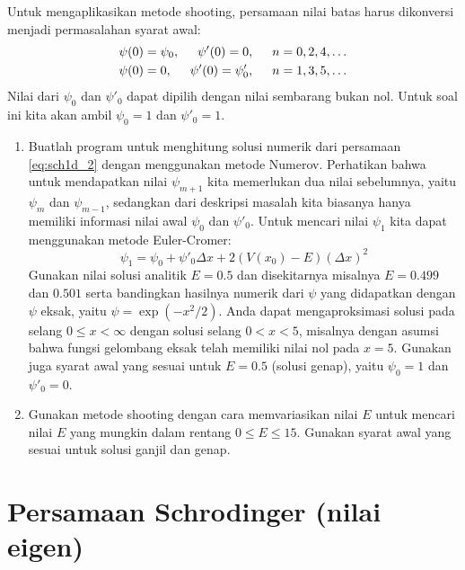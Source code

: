 \documentclass[12pt,bahasa]{article}
\begin{document}
Untuk mengaplikasikan metode shooting, persamaan nilai batas harus dikonversi menjadi
permasalahan syarat awal:
\begin{align}
\psi(0) & = \psi_{0},\hspace{0.5cm} \psi'(0) = 0,\hspace{0.5cm} n = 0,2,4,\ldots \\
\psi(0) & = 0,\hspace{0.5cm} \psi'(0) = \psi'_{0},\hspace{0.5cm} n = 1,3,5,\ldots
\end{align}
Nilai dari $\psi_0$ dan $\psi'_0$ dapat dipilih dengan nilai sembarang bukan nol.
Untuk soal ini kita akan ambil $\psi_0 = 1$ dan $\psi'_0 = 1$.

\begin{enumerate}[label=(\alph*)]
\item Buatlah program untuk menghitung solusi numerik dari persamaan \ref{eq:sch1d_2}
dengan menggunakan metode Numerov. Perhatikan bahwa untuk mendapatkan nilai $\psi_{m+1}$ kita memerlukan dua nilai
sebelumnya, yaitu $\psi_{m}$ dan $\psi_{m-1}$, sedangkan dari deskripsi masalah kita
biasanya hanya memiliki informasi nilai awal $\psi_{0}$ dan $\psi'_{0}$.
Untuk mencari nilai $\psi_{1}$ kita dapat menggunakan metode Euler-Cromer:
\begin{equation}
\psi_{1} = \psi_{0} + \psi'_{0}\Delta x + 2(V(x_{0}) - E)(\Delta x)^2
\end{equation}
Gunakan nilai solusi analitik $E = 0.5$ dan disekitarnya misalnya $E = 0.499$ dan $0.501$
serta bandingkan hasilnya numerik dari $\psi$ yang didapatkan dengan
$\psi$ eksak, yaitu $\psi = \exp(-x^2/2)$.
Anda dapat mengaproksimasi solusi pada selang $0 \leq x < \infty$
dengan solusi selang $0 < x < 5$, misalnya dengan asumsi bahwa fungsi gelombang
eksak telah memiliki nilai nol pada $x = 5$.
Gunakan juga syarat awal yang sesuai untuk $E = 0.5$ (solusi genap), yaitu
$\psi_{0} = 1$ dan $\psi'_{0} = 0$.
%
\item Gunakan metode shooting dengan cara memvariasikan nilai $E$ untuk mencari
nilai $E$ yang mungkin dalam rentang $0 \leq E \leq 15$. Gunakan syarat awal
yang sesuai untuk solusi ganjil dan genap.
\end{enumerate}


\section{Persamaan Schrodinger (nilai eigen)}
\end{document}
